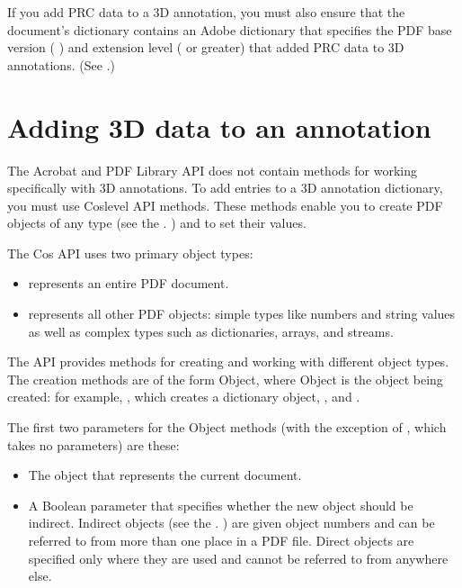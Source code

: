 \documentclass[letterpaper,12pt,english,openany,oneside]{sphinxmanual}
\begin{document}
If you add PRC data to a 3D annotation, you must also ensure that the document’s  dictionary contains an Adobe  dictionary that specifies the PDF base version ( ) and extension level ( or greater) that added PRC data to 3D annotations. (See .)


\section{Adding 3D data to an annotation}
\label{\detokenize{Plugins_3D_samples:adding-3d-data-to-an-annotation}}
The Acrobat and PDF Library API does not contain methods for working specifically with 3D annotations. To add entries to a 3D annotation dictionary, you must use Cos\sphinxhyphen{}level API methods. These methods enable you to create PDF objects of any type (see the . ) and to set their values.

The Cos API uses two primary object types:
\begin{itemize}
\item {} 
 represents an entire PDF document.

\item {} 
 represents all other PDF objects: simple types like numbers and string values as well as complex types such as dictionaries, arrays, and streams.

\end{itemize}

The API provides methods for creating and working with different object types. The creation methods are of the form  Object, where Object is the object being created: for example, , which creates a dictionary object, , and .

The first two parameters for the  Object methods (with the exception of , which takes no parameters) are these:
\begin{itemize}
\item {} 
The  object that represents the current document.

\item {} 
A Boolean parameter that specifies whether the new object should be indirect. Indirect objects (see the . ) are given object numbers and can be referred to from more than one place in a PDF file. Direct objects are specified only where they are used and cannot be referred to from anywhere else.

\end{itemize}
\end{document}
